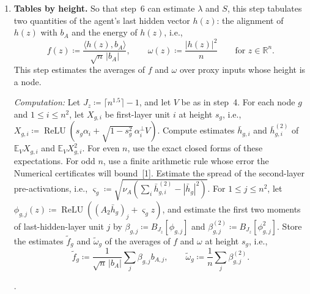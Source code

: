 \documentclass[10pt]{article}
\newcommand{\leanmark}[1]{{\relscale{0.78}\color{gray}[#1]}}
\newenvironment{leanitems}{\par\smallskip\relscale{0.78}\color{gray}\hypersetup{urlcolor=gray}\raggedright%
  \begin{list}{}{\setlength{\leftmargin}{2em}\setlength{\labelwidth}{1.6em}%
  \setlength{\labelsep}{0.4em}\setlength{\itemsep}{0pt}\setlength{\topsep}{0pt}%
  \setlength{\parsep}{0pt}}}{\end{list}\par\medskip}
\newcommand{\RR}{\mathbb{R}}
\newcommand{\EE}{\mathbb{E}}
\newcommand{\relu}{\operatorname{ReLU}}
\begin{document}
\begin{enumerate}[leftmargin=*,itemsep=8pt,topsep=10pt plus 2pt]
  \emph{Cost:} $4n^3+O(n^2)$ operations. Almost all of these operations compute the products
  $a_i\cdot\hat u$ and $|a_i|^2$.

\item \textbf{Tables by height.} So that step~6 can estimate $\lambda$ and
  $S$, this step tabulates two quantities of the agent's last hidden vector $h(z)$: the
  alignment of $h(z)$ with $b_A$ and the energy of $h(z)$, i.e.,
  \[f(z)\coloneqq \frac{\langle h(z),b_A\rangle}{\sqrt n\,|b_A|},\qquad
  \omega(z)\coloneqq \frac{|h(z)|^2}{n}\qquad\text{for }z\in\RR^n.\]
  This step estimates the averages of $f$ and $\omega$ over proxy inputs whose
  height is a node.

  \emph{Computation:} Let $J_z\coloneqq \lceil n^{1.5}\rceil-1$, and let $V$ be
  as in step~4. For each node $g$ and $1\le i\le n^2$, let $X_{g,i}$ be
  first-layer unit $i$ at height $s_g$, i.e.,
  $X_{g,i}\coloneqq \relu(s_g\alpha_i+\sqrt{1-s_g^2}\,\alpha^\perp_iV)$.
  Compute estimates $\bar h_{g,i}$ and $\bar h^{(2)}_{g,i}$ of $\EE_VX_{g,i}$
  and $\EE_VX_{g,i}^2$. For even $n$, use the exact closed forms of these expectations. For odd
  $n$, use a finite arithmetic rule whose error the Numerical certificates
  will bound~\leanmark{1}. Estimate the spread of the second-layer
  pre-activations, i.e.,
  $\varsigma_g\coloneqq \sqrt{\nu_A(\sum_i\bar h^{(2)}_{g,i}-|\bar h_g|^2)}$.
  For $1\le j\le n^2$, let
  $\phi_{g,j}(z)\coloneqq \relu((A_2\bar h_g)_j+\varsigma_gz)$, and estimate
  the first two moments of last-hidden-layer unit $j$ by
  $\beta_{g,j}\coloneqq B_{J_z}[\phi_{g,j}]$ and
  $\beta^{(2)}_{g,j}\coloneqq B_{J_z}[\phi_{g,j}^2]$. Store the estimates
  $\tilde f_g$ and $\tilde\omega_g$ of the averages of $f$ and $\omega$ at
  height $s_g$, i.e.,
  \[\tilde f_g\coloneqq \frac{1}{\sqrt n\,|b_A|}\sum_j\beta_{g,j}b_{A,j},\qquad
  \tilde\omega_g\coloneqq \frac1n\sum_j\beta^{(2)}_{g,j}.\]
  \begin{leanitems}
  .
  \end{leanitems}


\end{enumerate}
\end{document}
